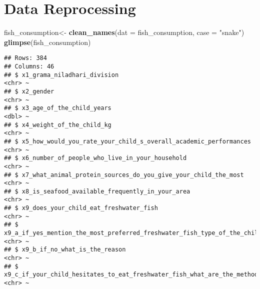 \documentclass[
]{article}
\newenvironment{Shaded}{\begin{snugshade}}{\end{snugshade}}
\newcommand{\AttributeTok}[1]{\textcolor[rgb]{0.13,0.29,0.53}{#1}}
\newcommand{\FunctionTok}[1]{\textcolor[rgb]{0.13,0.29,0.53}{\textbf{#1}}}
\newcommand{\NormalTok}[1]{#1}
\newcommand{\OtherTok}[1]{\textcolor[rgb]{0.56,0.35,0.01}{#1}}
\newcommand{\StringTok}[1]{\textcolor[rgb]{0.31,0.60,0.02}{#1}}
\begin{document}
\hypertarget{data-reprocessing}{%
\section{Data Reprocessing}\label{data-reprocessing}}

\begin{Shaded}
\begin{Highlighting}[]
\NormalTok{fish\_consumption}\OtherTok{\textless{}{-}} \FunctionTok{clean\_names}\NormalTok{(}\AttributeTok{dat =}\NormalTok{ fish\_consumption, }\AttributeTok{case =} \StringTok{"snake"}\NormalTok{) }
\FunctionTok{glimpse}\NormalTok{(fish\_consumption)}
\end{Highlighting}
\end{Shaded}

\begin{verbatim}
## Rows: 384
## Columns: 46
## $ x1_grama_niladhari_division                                                                                                                  <chr> ~
## $ x2_gender                                                                                                                                    <chr> ~
## $ x3_age_of_the_child_years                                                                                                                    <dbl> ~
## $ x4_weight_of_the_child_kg                                                                                                                    <chr> ~
## $ x5_how_would_you_rate_your_child_s_overall_academic_performances                                                                             <chr> ~
## $ x6_number_of_people_who_live_in_your_household                                                                                               <chr> ~
## $ x7_what_animal_protein_sources_do_you_give_your_child_the_most                                                                               <chr> ~
## $ x8_is_seafood_available_frequently_in_your_area                                                                                              <chr> ~
## $ x9_does_your_child_eat_freshwater_fish                                                                                                       <chr> ~
## $ x9_a_if_yes_mention_the_most_preferred_freshwater_fish_type_of_the_child                                                                     <chr> ~
## $ x9_b_if_no_what_is_the_reason                                                                                                                <chr> ~
## $ x9_c_if_your_child_hesitates_to_eat_freshwater_fish_what_are_the_methods_you_used_to_encourage_improve_their_consumption_usually             <chr> ~

\end{verbatim}
\end{document}
